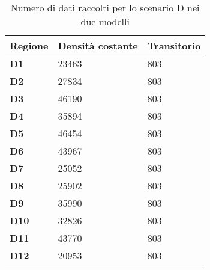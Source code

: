 \documentclass[a4paper, 12pt]{article}
\begin{document}
\begin{table}[h]
  \centering
  \resizebox{0.7\textwidth}{!} {
 \begin{tabular}[t]{ |l|l|l| }
	 	\hline
	\textbf{Regione}	&		\textbf{Densità costante}	&		\textbf{Transitorio}	\\ \hline
	\textbf{D1} 	 &		23463					&	803	\\ \hline
	\textbf{D2}		 &		27834 				&		803		\\ \hline
	\textbf{D3}		 &		46190 				&		803		\\ \hline
	\textbf{D4}		 &		35894 				&		803		\\ \hline
	\textbf{D5}		 &		46454 				&		803		\\ \hline
	\textbf{D6}		 &		43967 				&		803		\\ \hline
	\textbf{D7}		 &		25052 				&		803		\\ \hline
	\textbf{D8}		 &		25902 				&		803		\\ \hline
	\textbf{D9}		 &		35990 				&		803		\\ \hline
	\textbf{D10}	 &		32826 				&		803		\\ \hline
	\textbf{D11}	 &		43770 				&		803		\\ \hline
	\textbf{D12}	 &		20953 					&		803		\\ \hline
	
	
  \end{tabular}
  
  }
  \caption{Numero di dati raccolti per lo scenario D nei due modelli}
  \label{tab:tabella-dati-simulazioni-D}
\end{table}
\end{document}
